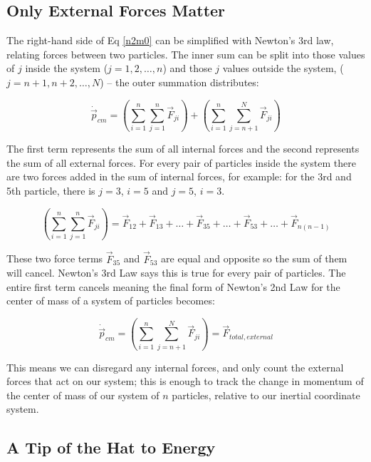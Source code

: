 \documentclass[10pt]{article}
\begin{document}
\subsection{Only External Forces Matter}

The right-hand side of Eq \ref{n2m0} can be simplified with Newton's 3rd law, 
relating forces between two particles. The inner sum can be split into 
those values of $j$ inside the system ($j = 1,2,\ldots,n$) and 
those $j$ values outside the system, ($j = n+1,n+2,\ldots,N$) -- the outer 
summation distributes:

\begin{equation*}
    \dot{\vec{p}}_{cm} =\left(\sum_{i=1}^n\sum_{j=1}^{n}\vec{F}_{ji}\right) + 
        \left(\sum_{i=1}^n\sum_{j=n+1}^{N}\vec{F}_{ji}\right)
\end{equation*}

The first term represents the sum of all 
internal forces and the second represents the sum of all external forces.
For every pair of particles inside the system there are two forces 
added in the sum of internal forces, for example: for the 3rd and 5th particle,
there is $j=3$, $i=5$ and $j=5$, $i=3$. 

\begin{equation*}
    \left(\sum_{i=1}^n\sum_{j=1}^{n}\vec{F}_{ji}\right) = 
        \vec{F}_{12}+\vec{F}_{13} + \ldots + \vec{F}_{35} + \ldots 
        + \vec{F}_{53} + \ldots + \vec{F}_{n(n-1)}
\end{equation*}

These two force terms $\vec{F}_{35}$ and $\vec{F}_{53}$ are equal and 
opposite so the sum of them will cancel.
Newton's 3rd Law says this is true for every pair of particles. The entire 
first term cancels meaning the final form of Newton's 2nd Law for 
the center of mass of a system of particles becomes:

\begin{equation}
    \dot{\vec{p}}_{cm} = \left(\sum_{i=1}^n\sum_{j=n+1}^{N}\vec{F}_{ji}\right) 
        = \vec{F}_{total,external} \label{n2m}
\end{equation}

This means we can disregard any internal forces, and only 
count the external forces that act on our system; 
this is enough to track the change in 
momentum of the center of mass of our system of $n$ particles, 
relative to our inertial coordinate system.

\subsection{A Tip of the Hat to Energy}
\end{document}
